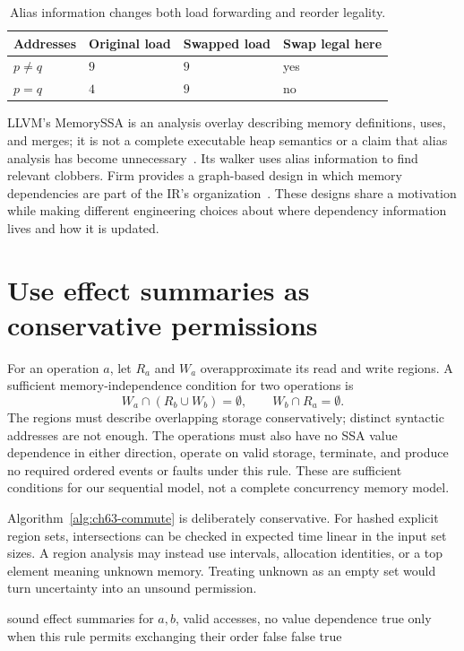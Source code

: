 \begin{table}[htbp]
\caption{Alias information changes both load forwarding and reorder legality.}
\label{tab:ch63-alias}
\centering
\begin{tabular}{llll}
\toprule
Addresses & Original load & Swapped load & Swap legal here \\
\midrule
$p\ne q$ & $9$ & $9$ & yes \\
$p=q$ & $4$ & $9$ & no \\
\bottomrule
\end{tabular}
\end{table}

LLVM's MemorySSA is an analysis overlay describing memory definitions, uses, and merges; it is not a complete executable heap semantics or a claim that alias analysis has become unnecessary~\cite{llvm-2026-memoryssa}.
Its walker uses alias information to find relevant clobbers.
Firm provides a graph-based design in which memory dependencies are part of the IR's organization~\cite{braun-2011-firm}.
These designs share a motivation while making different engineering choices about where dependency information lives and how it is updated.

\section{Use effect summaries as conservative permissions}
\label{sec:ch63-commute}

For an operation $a$, let $R_a$ and $W_a$ overapproximate its read and write regions.
A sufficient memory-independence condition for two operations is
\[
W_a\cap(R_b\cup W_b)=\emptyset,
\qquad W_b\cap R_a=\emptyset.
\]
The regions must describe overlapping storage conservatively; distinct syntactic addresses are not enough.
The operations must also have no SSA value dependence in either direction, operate on valid storage, terminate, and produce no required ordered events or faults under this rule.
These are sufficient conditions for our sequential model, not a complete concurrency memory model.

Algorithm~\ref{alg:ch63-commute} is deliberately conservative.
For hashed explicit region sets, intersections can be checked in expected time linear in the input set sizes.
A region analysis may instead use intervals, allocation identities, or a top element meaning unknown memory.
Treating unknown as an empty set would turn uncertainty into an unsound permission.

\begin{algorithm}[htbp]
\caption{Check a sufficient condition for swapping two sequential operations.}
\label{alg:ch63-commute}
\begin{pseudocode}
\Require sound effect summaries for $a,b$, valid accesses, no value dependence
\Ensure true only when this rule permits exchanging their order
  \State \Return false
\EndIf
{}
  \State \Return false
\EndIf
\State \Return true
\end{pseudocode}
\end{algorithm}

